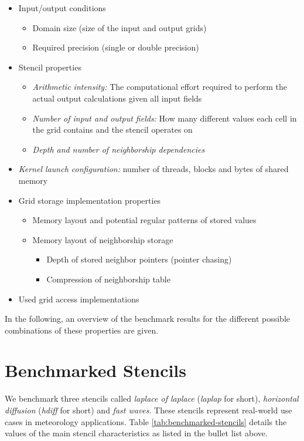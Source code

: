 \begin{itemize}
	\item 
		Input/output conditions 
		\begin{itemize}
			\item Domain size (size of the input and output grids)
			\item Required precision (single or double precision)
		\end{itemize}
	\item
		Stencil properties
		\begin{itemize}
			\item \emph{Arithmetic intensity:} The computational effort required to perform the actual output calculations given all input fields
			\item \emph{Number of input and output fields:} How many different values each cell in the grid contains and the stencil operates on
			\item \emph{Depth and number of neighborship dependencies}
		\end{itemize}
	\item
		\emph{Kernel launch configuration:} number of threads, blocks and bytes of shared memory
	\item
		Grid storage implementation properties
		\begin{itemize}
			\item Memory layout and potential regular patterns of stored values
			\item 
				Memory layout of neighborship storage
				\begin{itemize}
					\item Depth of stored neighbor pointers (pointer chasing)
					\item Compression of neighborship table
				\end{itemize}
		\end{itemize}
	\item
		Used grid access implementations
\end{itemize}

In the following, an overview of the benchmark results for the different possible combinations of these properties are given.

\section{Benchmarked Stencils}\label{sec:benchmark-setup}

We benchmark three stencils called \emph{laplace of laplace} (\emph{laplap} for short), \emph{horizontal diffusion} (\emph{hdiff} for short) and \emph{fast waves}. These stencils represent real-world use cases in meteorology applications. Table \ref{tab:benchmarked-stencils} details the values of the main stencil characteristics as listed in the bullet list above.

